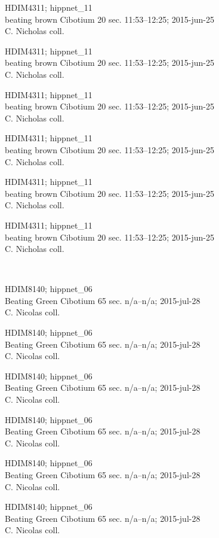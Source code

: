 \documentclass[2pt]{extarticle}
\begin{document}
\noindent
\parbox{0.16\textwidth}{\tiny \raggedright \rule[-0.3\baselineskip]{0pt}{10pt}HDIM4311; hippnet\_11\\ beating brown Cibotium 20 sec. 11:53--12:25; 2015-jun-25\\ C. Nicholas coll.}
\parbox{0.16\textwidth}{\tiny \raggedright \rule[-0.3\baselineskip]{0pt}{10pt}HDIM4311; hippnet\_11\\ beating brown Cibotium 20 sec. 11:53--12:25; 2015-jun-25\\ C. Nicholas coll.}
\parbox{0.16\textwidth}{\tiny \raggedright \rule[-0.3\baselineskip]{0pt}{10pt}HDIM4311; hippnet\_11\\ beating brown Cibotium 20 sec. 11:53--12:25; 2015-jun-25\\ C. Nicholas coll.}
\parbox{0.16\textwidth}{\tiny \raggedright \rule[-0.3\baselineskip]{0pt}{10pt}HDIM4311; hippnet\_11\\ beating brown Cibotium 20 sec. 11:53--12:25; 2015-jun-25\\ C. Nicholas coll.}
\parbox{0.16\textwidth}{\tiny \raggedright \rule[-0.3\baselineskip]{0pt}{10pt}HDIM4311; hippnet\_11\\ beating brown Cibotium 20 sec. 11:53--12:25; 2015-jun-25\\ C. Nicholas coll.}
\parbox{0.16\textwidth}{\tiny \raggedright \rule[-0.3\baselineskip]{0pt}{10pt}HDIM4311; hippnet\_11\\ beating brown Cibotium 20 sec. 11:53--12:25; 2015-jun-25\\ C. Nicholas coll.} \\ 
\vspace{0.001in} 

\noindent
\parbox{0.16\textwidth}{\tiny \raggedright \rule[-0.3\baselineskip]{0pt}{10pt}HDIM8140; hippnet\_06\\ Beating Green Cibotium 65 sec. n/a--n/a; 2015-jul-28\\ C. Nicolas coll.}
\parbox{0.16\textwidth}{\tiny \raggedright \rule[-0.3\baselineskip]{0pt}{10pt}HDIM8140; hippnet\_06\\ Beating Green Cibotium 65 sec. n/a--n/a; 2015-jul-28\\ C. Nicolas coll.}
\parbox{0.16\textwidth}{\tiny \raggedright \rule[-0.3\baselineskip]{0pt}{10pt}HDIM8140; hippnet\_06\\ Beating Green Cibotium 65 sec. n/a--n/a; 2015-jul-28\\ C. Nicolas coll.}
\parbox{0.16\textwidth}{\tiny \raggedright \rule[-0.3\baselineskip]{0pt}{10pt}HDIM8140; hippnet\_06\\ Beating Green Cibotium 65 sec. n/a--n/a; 2015-jul-28\\ C. Nicolas coll.}
\parbox{0.16\textwidth}{\tiny \raggedright \rule[-0.3\baselineskip]{0pt}{10pt}HDIM8140; hippnet\_06\\ Beating Green Cibotium 65 sec. n/a--n/a; 2015-jul-28\\ C. Nicolas coll.}
\parbox{0.16\textwidth}{\tiny \raggedright \rule[-0.3\baselineskip]{0pt}{10pt}HDIM8140; hippnet\_06\\ Beating Green Cibotium 65 sec. n/a--n/a; 2015-jul-28\\ C. Nicolas coll.} \\ 
\vspace{0.001in} 
\end{document}
